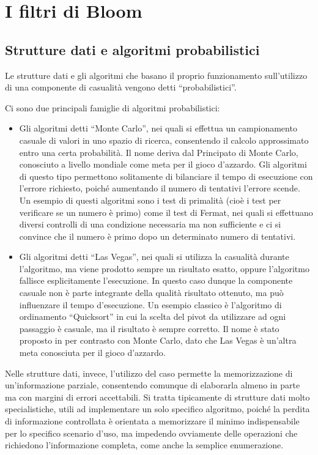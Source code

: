 \chapter{I filtri di Bloom}

\section{Strutture dati e algoritmi probabilistici}

Le strutture dati e gli algoritmi che basano il proprio funzionamento sull'utilizzo di una componente
di casualità vengono detti ``probabilistici''. 

Ci sono due principali famiglie di algoritmi probabilistici:

\begin{itemize}
	\medskip

	\item Gli algoritmi detti ``Monte Carlo'', nei quali si effettua un campionamento casuale di
	valori in uno spazio di ricerca, consentendo il calcolo approssimato entro una certa
	probabilità. Il nome deriva dal Principato di Monte Carlo, conosciuto a livello mondiale come
	meta per il gioco d'azzardo. Gli algoritmi di questo tipo permettono solitamente di bilanciare
	il tempo di esecuzione con l'errore richiesto, poiché aumentando il numero di tentativi l'errore
	scende. Un esempio di questi algoritmi sono i test di primalità (cioè i test per verificare se
	un numero è primo) come il test di Fermat, nei quali si effettuano diversi controlli di una
	condizione necessaria ma non sufficiente e ci si convince che il numero è primo dopo un
	determinato numero di tentativi.

	\item Gli algoritmi detti ``Las Vegas'', nei quali si utilizza la casualità durante l'algoritmo,
	ma viene prodotto sempre un risultato esatto, oppure l'algoritmo fallisce esplicitamente
	l'esecuzione. In questo caso dunque la componente casuale non è parte integrante della qualità
	risultato ottenuto, ma può influenzare il tempo d'esecuzione. Un esempio classico è l'algoritmo
	di ordinamento ``Quicksort'' in cui la scelta del pivot da utilizzare ad ogni passaggio è
	casuale, ma il risultato è sempre corretto. Il nome è stato proposto in \cite{lasvegas} per
	contrasto con Monte Carlo, dato che Las Vegas è un'altra meta conosciuta per il gioco d'azzardo.
\end{itemize}

Nelle strutture dati, invece, l'utilizzo del caso permette la memorizzazione di un'informazione
parziale, consentendo comunque di elaborarla almeno in parte ma con margini di errori
accettabili. Si tratta tipicamente di strutture dati molto specialistiche, utili ad implementare un
solo specifico algoritmo, poiché la perdita di informazione controllata è orientata a memorizzare il
minimo indispensabile per lo specifico scenario d'uso, ma impedendo ovviamente delle operazioni che
richiedono l'informazione completa, come anche la semplice enumerazione.

